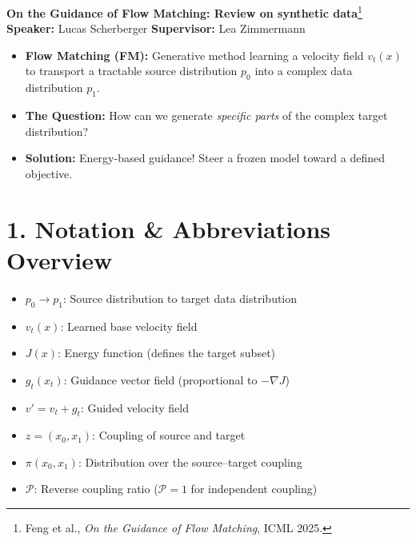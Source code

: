 \documentclass[11pt,a4paper]{article}
\begin{document}
\begin{center}
    \Large \textbf{\textcolor{tumblue}{On the Guidance of Flow Matching: Review on synthetic data}}\footnote{Feng et al., \textit{On the Guidance of Flow Matching}, ICML 2025.} \\
    \vspace{0.15cm}
    \normalsize \textbf{Speaker:} Lucas Scherberger \hspace{1cm} \textbf{Supervisor:} Lea Zimmermann
\end{center}
\vspace{0.3cm}

\begin{tcolorbox}[colback=tumblue!5!white, colframe=tumblue, title=\textbf{Motivation \& Core Objective}]
\begin{itemize}[leftmargin=*, nosep]
    \item \textbf{Flow Matching (FM):} Generative method learning a velocity field $v_t(x)$ to transport a tractable source distribution $p_0$ into a complex data distribution $p_1$.
    \item \textbf{The Question:} How can we generate \textit{specific parts} of the complex target distribution?
    \item \textbf{Solution:} Energy-based guidance! Steer a frozen model toward a defined objective.
\end{itemize}
\end{tcolorbox}

\section*{1. Notation \& Abbreviations Overview}
\begin{itemize}[leftmargin=*, nosep]
    \item $p_0 \rightarrow p_1$: Source distribution to target data distribution
    \item $v_t(x)$: Learned base velocity field
    \item $J(x)$: Energy function (defines the target subset)
    \item $g_t(x_t)$: Guidance vector field (proportional to $-\nabla J$)
    \item $v' = v_t + g_t$: Guided velocity field
    \item $z = (x_0, x_1)$: Coupling of source and target
    \item $\pi(x_0, x_1)$: Distribution over the source--target coupling
    \item $\mathcal{P}$: Reverse coupling ratio ($\mathcal{P} = 1$ for independent coupling)
\end{itemize}
\end{document}
